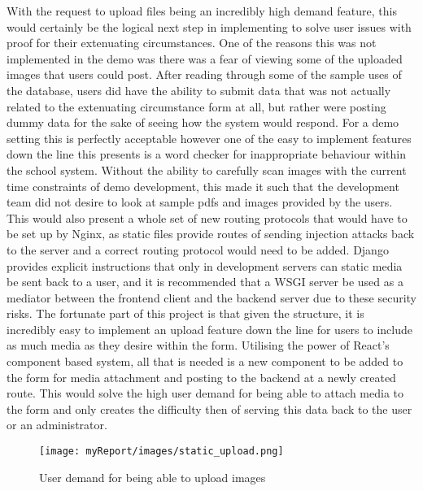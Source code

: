 With the request to upload files being an incredibly high demand feature, this would certainly be the logical next step in implementing to solve user issues with proof for their extenuating circumstances. One of the reasons this was not implemented in the demo was there was a fear of viewing some of the uploaded images that users could post. After reading through some of the sample uses of the database, users did have the ability to submit data that was not actually related to the extenuating circumstance form at all, but rather were posting dummy data for the sake of seeing how the system would respond. For a demo setting this is perfectly acceptable however one of the easy to implement features down the line this presents is a word checker for inappropriate behaviour within the school system.
\newline
\newline
Without the ability to carefully scan images with the current time constraints of demo development, this made it such that the development team did not desire to look at sample pdfs and images provided by the users. This would also present a whole set of new routing protocols that would have to be set up by Nginx, as static files provide routes of sending injection attacks back to the server and a correct routing protocol would need to be added. Django provides explicit instructions that only in development servers can static media be sent back to a user, and it is recommended that a WSGI server be used as a mediator between the frontend client and the backend server due to these security risks.
\newline
\newline
The fortunate part of this project is that given the structure, it is incredibly easy to implement an upload feature down the line for users to include as much media as they desire within the form. Utilising the power of React’s component based system, all that is needed is a new component to be added to the form for media attachment and posting to the backend at a newly created route. This would solve the high user demand for being able to attach media to the form and only creates the difficulty then of serving this data back to the user or an administrator.

\begin{figure}[H]
\centering
\texttt{[image: myReport/images/static\_upload.png]}
\caption{User demand for being able to upload images}
\label{fig:static_upload}
\end{figure}

